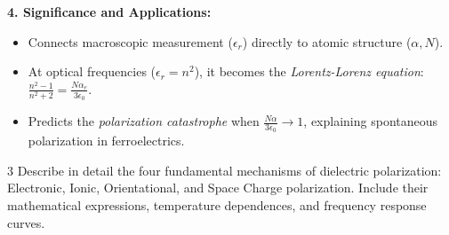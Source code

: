 \begin{theorysol}
\textbf{4. Significance and Applications:}
\begin{itemize}
\item Connects macroscopic measurement ($\epsilon_r$) directly to atomic structure ($\alpha, N$).
\item At optical frequencies ($\epsilon_r = n^2$), it becomes the \textit{Lorentz-Lorenz equation}: $\frac{n^2 - 1}{n^2 + 2} = \frac{N\alpha_e}{3\epsilon_0}$.
\item Predicts the \textit{polarization catastrophe} when $\frac{N\alpha}{3\epsilon_0} \to 1$, explaining spontaneous polarization in ferroelectrics.
\end{itemize}
\end{theorysol}
\vspace{4mm}

\begin{theoryq}{3}
Describe in detail the four fundamental mechanisms of dielectric polarization: Electronic, Ionic, Orientational, and Space Charge polarization. Include their mathematical expressions, temperature dependences, and frequency response curves.
\end{theoryq}
